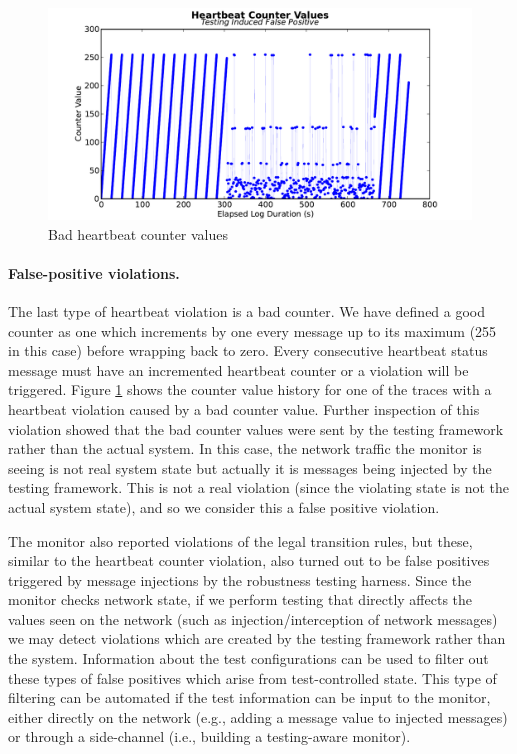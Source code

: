 \begin{figure}[t]
\includegraphics[width=4.5in]{img/hb2}
\caption{Bad heartbeat counter values \label{fig:hb_badcounter}}
\end{figure}

\paragraph{False-positive violations.}
The last type of heartbeat violation is a bad counter. 
We have defined a good counter as one which increments by one every message up to its maximum (255 in this case) before wrapping back to zero.
Every consecutive heartbeat status message must have an incremented heartbeat counter or a violation will be triggered. Figure \ref{fig:hb_badcounter} shows the counter value history for one of the traces with a heartbeat violation caused by a bad counter value.
%
Further inspection of this violation showed that the bad counter values were sent by the testing framework rather than the actual system. In this case, the network traffic the monitor is seeing is not real system state but actually it is messages being injected by the testing framework. This is not a real violation (since the violating state is not the actual system state), and so we consider this a false positive violation.



The monitor also reported violations of the legal transition rules, but these, similar to the heartbeat counter violation, also turned out to be false positives triggered by message injections by the robustness testing harness. Since the monitor checks network state, if we perform testing that directly affects the values seen on the network (such as injection/interception of network messages) we may detect violations which are created by the testing framework rather than the system. 
Information about the test configurations can be used to filter out these types of false positives which arise from test-controlled state.
This type of filtering can be automated if the test information can be input to the monitor, either directly on the network (e.g., adding a message value to injected messages) or through a side-channel (i.e., building a testing-aware monitor).
